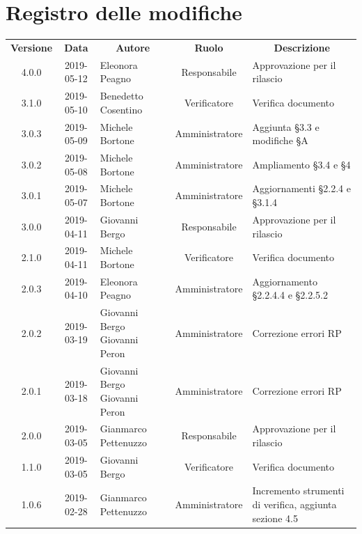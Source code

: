 \documentclass[11pt,a4paper]{article}
\begin{document}
	
	
	{\def\arraystretch{2}\tabcolsep=10pt
	\newpage
	\section*{\centering Registro delle modifiche}
	\begin{tabularx}{\textwidth}{ c | c | p{3.80cm} | c | X }
		\rowcolor{LightBlue}
		\color{white}\bfseries Versione & \color{white}\bfseries Data & \multicolumn{1}{c}{\color{white}\bfseries Autore}
		& \color{white}\bfseries Ruolo & \multicolumn{1}{c}{\color{white}\bfseries Descrizione}\\[0.25cm]
		4.0.0 & 2019-05-12 & Eleonora Peagno & Responsabile & Approvazione per il rilascio \\ \hline
		3.1.0 & 2019-05-10 & Benedetto Cosentino & Verificatore & Verifica documento \\ \hline
		3.0.3 & 2019-05-09 & Michele Bortone & Amministratore & Aggiunta \S3.3 e modifiche \S A \\ \hline
		3.0.2 & 2019-05-08 & Michele Bortone & Amministratore & Ampliamento \S3.4 e \S4 \\ \hline
		3.0.1 & 2019-05-07 & Michele Bortone & Amministratore & Aggiornamenti  \S2.2.4 e \S3.1.4\\ \hline
		3.0.0 & 2019-04-11 & Giovanni Bergo & Responsabile & Approvazione per il rilascio \\ \hline
		2.1.0 & 2019-04-11 & Michele Bortone & Verificatore & Verifica documento \\ \hline
		2.0.3 & 2019-04-10 & Eleonora Peagno & Amministratore & Aggiornamento \S2.2.4.4 e \S2.2.5.2 \\ \hline
		2.0.2 & 2019-03-19 & Giovanni Bergo \newline Giovanni Peron & Amministratore & Correzione errori RP \\ \hline
		2.0.1 & 2019-03-18 & Giovanni Bergo \newline Giovanni Peron & Amministratore & Correzione errori RP \\ \hline
		2.0.0 & 2019-03-05 & Gianmarco Pettenuzzo & Responsabile & Approvazione per il rilascio \\ \hline
		1.1.0 & 2019-03-05 & Giovanni Bergo & Verificatore & Verifica documento \\ \hline
		1.0.6 & 2019-02-28 & Gianmarco Pettenuzzo & Amministratore & Incremento strumenti di verifica, aggiunta sezione 4.5 \\ \hline

\end{tabularx}}
\end{document}
